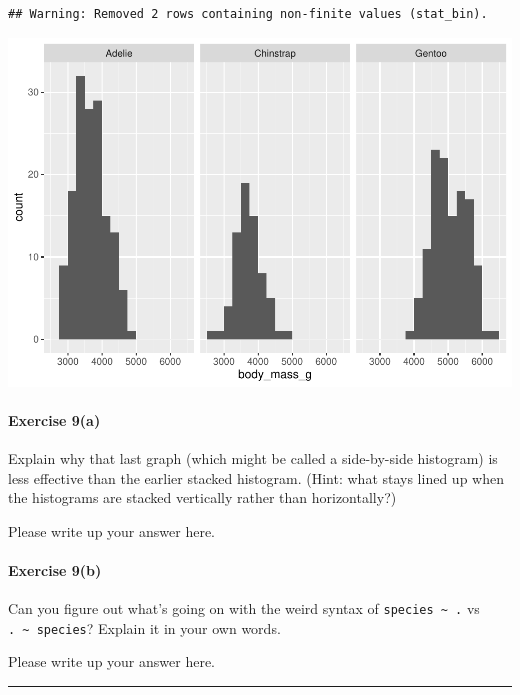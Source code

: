 \documentclass[
]{book}
\begin{document}
\begin{verbatim}
## Warning: Removed 2 rows containing non-finite values (stat_bin).
\end{verbatim}

\includegraphics{intro_stats_files/figure-latex/unnamed-chunk-110-1.pdf}

\hypertarget{exercise-9a-1}{%
\paragraph*{Exercise 9(a)}\label{exercise-9a-1}}

Explain why that last graph (which might be called a side-by-side histogram) is less effective than the earlier stacked histogram. (Hint: what stays lined up when the histograms are stacked vertically rather than horizontally?)

Please write up your answer here.

\hypertarget{exercise-9b-1}{%
\paragraph*{Exercise 9(b)}\label{exercise-9b-1}}

Can you figure out what's going on with the weird syntax of \texttt{species\ \textasciitilde{}\ .} vs \texttt{.\ \textasciitilde{}\ species}? Explain it in your own words.

Please write up your answer here.

\begin{center}\rule{0.5\linewidth}{0.5pt}\end{center}
\end{document}
